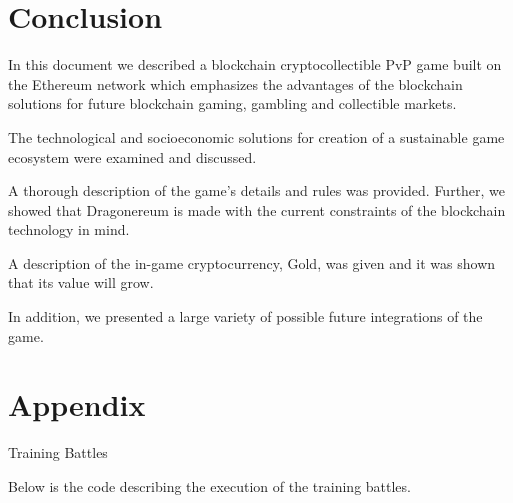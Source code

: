 \documentclass[12pt]{article}
\begin{document}

\newpage

\vspace{\baselineskip}\section{Conclusion}
In this document we described a blockchain cryptocollectible PvP game built on the Ethereum network which emphasizes the advantages of the blockchain solutions for future blockchain gaming, gambling and collectible markets.  \par

The technological and socioeconomic solutions for creation of a sustainable game ecosystem were examined and discussed.\par

A thorough description of the game’s details and rules was provided. Further, we showed that Dragonereum is made with the current constraints of the blockchain technology in mind.\par

A description of the in-game cryptocurrency, Gold, was given and it was shown that its value will grow.  \par

In addition, we presented a large variety of possible future integrations of the game.\par

\vspace{\baselineskip}

 

\newpage
\printbibliography

\newpage
\section*{Appendix}


  \begin{Large}
  {Training Battles}%
  \end{Large}


\vspace{\baselineskip}
Below is the code describing the execution of the training battles.\par
\end{document}
